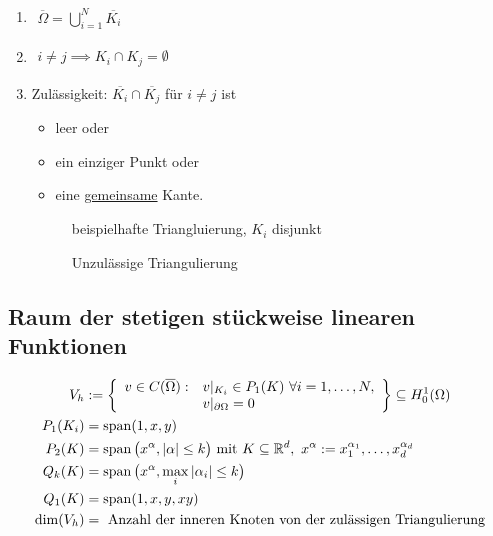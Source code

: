 \begin{enumerate}[label=(\roman*)]
\item $\begin{aligned}
\overline{\Omega}=\bigcup\limits_{i=1}^N \overline{K_i}
\end{aligned}$ 

\item $\begin{aligned}
i\neq j\implies K_i\cap K_j=\emptyset
\end{aligned}$
\item Zulässigkeit: $\overline{K_i}\cap\overline{K_j}$ für $i\neq j$ ist
\begin{itemize}
\item leer oder
\item ein einziger Punkt oder
\item eine \ul{gemeinsame} Kante.
\end{itemize}

\begin{figure}[!ht]
\begin{center}

\caption{beispielhafte Triangluierung, $K_i$ disjunkt}
\label{AbbTriangulierung}
\end{center}
\end{figure}

\begin{figure}[!ht]
\begin{center}

\caption{Unzulässige Triangulierung}
\label{AbbUnzulaessigeTriangulierung}
\end{center}
\end{figure}
\end{enumerate}

\subsection*{Raum der stetigen stückweise linearen Funktionen}
\begin{align*}
V_h&:=\left\lbrace
\begin{array}{rl}
	v\in C(\overline{\Omega}) : &v|_{K_i}\in P_1(K)~\forall i=1,\ldots,N,\\
	&v|_{\partial\Omega}=0
\end{array}\right\rbrace
	\subseteq H^1_0(\Omega)\\
P_1(K_i)&=\operatorname{span}(1,x,y)\\
P_2(K)&=\operatorname{span}\big( x^\alpha, |\alpha|\leq k\big)\text{ mit } K\subseteq\mathbb{R}^d,~ x^{\alpha}:=x_1^{\alpha_1},\ldots,x_d^{\alpha_d}\\
Q_k(K)&=\operatorname{span}\big(x^\alpha,\max\limits_i |\alpha_i|\leq k\big)\\
Q_1(K)&=\operatorname{span}(1,x,y,xy)\\
\dim(V_h)&=\text{ Anzahl der inneren Knoten von der zulässigen Triangulierung}\\
\end{align*}


